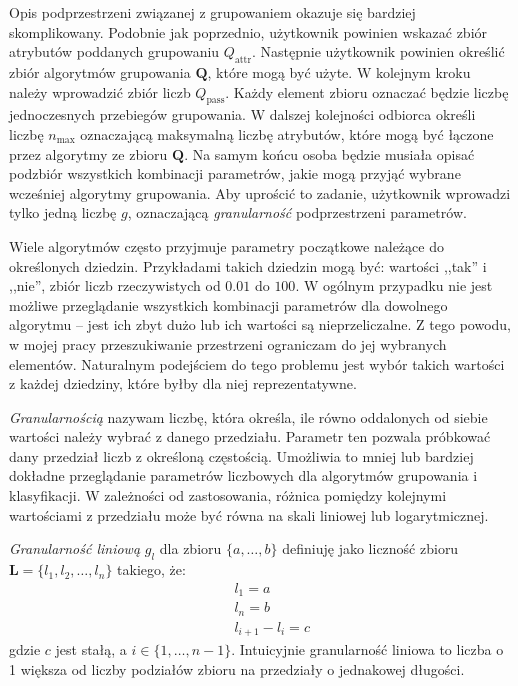 \documentclass[../thesis.tex]{subfiles}
\begin{document}
Opis podprzestrzeni związanej z grupowaniem okazuje się bardziej skomplikowany. Podobnie jak poprzednio, użytkownik powinien wskazać zbiór atrybutów poddanych grupowaniu $Q_\textrm{attr}$. Następnie użytkownik powinien określić zbiór algorytmów grupowania $\textbf{Q}$, które mogą być użyte. W kolejnym kroku należy wprowadzić zbiór liczb $Q_\textrm{pass}$. Każdy element zbioru oznaczać będzie liczbę jednoczesnych przebiegów grupowania. W dalszej kolejności odbiorca określi liczbę $n_\textrm{max}$ oznaczającą maksymalną liczbę atrybutów, które mogą być łączone przez algorytmy ze zbioru $\textbf{Q}$. Na samym końcu osoba będzie musiała opisać podzbiór wszystkich kombinacji parametrów, jakie mogą przyjąć wybrane wcześniej algorytmy grupowania. Aby uprościć to zadanie, użytkownik wprowadzi tylko jedną liczbę $g$, oznaczającą \textit{granularność} podprzestrzeni parametrów. 

Wiele algorytmów często przyjmuje parametry początkowe należące do określonych dziedzin. Przykładami takich dziedzin mogą być: wartości ,,tak'' i ,,nie'', zbiór liczb rzeczywistych od $0.01$ do $100$. W ogólnym przypadku nie jest możliwe przeglądanie wszystkich kombinacji parametrów dla dowolnego algorytmu -- jest ich zbyt dużo lub ich wartości są nieprzeliczalne. Z tego powodu, w mojej pracy przeszukiwanie przestrzeni ograniczam do jej wybranych elementów. Naturalnym podejściem do tego problemu jest wybór takich wartości z każdej dziedziny, które byłby dla niej reprezentatywne. 

\emph{Granularnością} nazywam liczbę, która określa, ile równo oddalonych od siebie wartości należy wybrać z danego przedziału. Parametr ten pozwala próbkować dany przedział liczb z określoną częstością. Umożliwia to mniej lub bardziej dokładne przeglądanie parametrów liczbowych dla algorytmów grupowania i klasyfikacji. W zależności od zastosowania, różnica pomiędzy kolejnymi wartościami z przedziału może być równa na skali liniowej lub logarytmicznej.

\textit{Granularność liniową} $g_l$ dla zbioru $\{a, \ldots, b\}$ definiuję jako liczność zbioru $\textbf{L} = \{l_1, l_2, \ldots, l_n\}$ takiego, że:
\begin{eqnarray*}
&& l_1 = a \\
&& l_n = b \\
&& l_{i+1} - l_i = c
\end{eqnarray*}
gdzie $c$ jest stałą, a $i \in \{1, \ldots, n-1\}$. Intuicyjnie granularność liniowa to liczba o 1 większa od liczby podziałów zbioru na przedziały o jednakowej długości.
\end{document}
